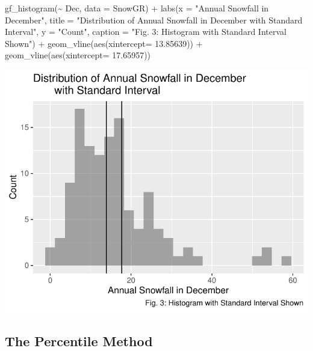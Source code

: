 \documentclass[12pt]{article}
\newenvironment{Shaded}{\begin{snugshade}}{\end{snugshade}}
\newcommand{\AttributeTok}[1]{\textcolor[rgb]{0.77,0.63,0.00}{#1}}
\newcommand{\FloatTok}[1]{\textcolor[rgb]{0.00,0.00,0.81}{#1}}
\newcommand{\FunctionTok}[1]{\textcolor[rgb]{0.00,0.00,0.00}{#1}}
\newcommand{\NormalTok}[1]{#1}
\newcommand{\SpecialCharTok}[1]{\textcolor[rgb]{0.00,0.00,0.00}{#1}}
\newcommand{\StringTok}[1]{\textcolor[rgb]{0.31,0.60,0.02}{#1}}
\begin{document}
\begin{Shaded}
\begin{Highlighting}[]
\FunctionTok{gf\_histogram}\NormalTok{(}\SpecialCharTok{\textasciitilde{}}\NormalTok{ Dec, }\AttributeTok{data =}\NormalTok{ SnowGR) }\SpecialCharTok{+}
  \FunctionTok{labs}\NormalTok{(}\AttributeTok{x =} \StringTok{"Annual Snowfall in December"}\NormalTok{, }
       \AttributeTok{title =} \StringTok{"Distribution of Annual Snowfall in December }
\StringTok{       with Standard Interval"}\NormalTok{, }\AttributeTok{y =} \StringTok{"Count"}\NormalTok{,}
       \AttributeTok{caption =} \StringTok{"Fig. 3: Histogram with Standard Interval Shown"}\NormalTok{) }\SpecialCharTok{+}
  \FunctionTok{geom\_vline}\NormalTok{(}\FunctionTok{aes}\NormalTok{(}\AttributeTok{xintercept=} \FloatTok{13.85639}\NormalTok{)) }\SpecialCharTok{+}
  \FunctionTok{geom\_vline}\NormalTok{(}\FunctionTok{aes}\NormalTok{(}\AttributeTok{xintercept=} \FloatTok{17.65957}\NormalTok{))}
\end{Highlighting}
\end{Shaded}

\includegraphics{paper_files/figure-latex/unnamed-chunk-3-1.pdf}

\hypertarget{the-percentile-method}{%
\subsection{The Percentile Method}\label{the-percentile-method}}
\end{document}
